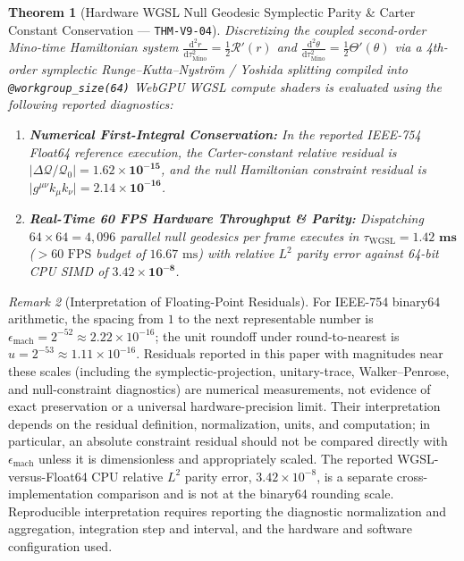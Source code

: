 \documentclass[11pt,a4paper,reqno]{article}
\theoremstyle{plain}
\newtheorem{theorem}{Theorem}[section]
\theoremstyle{definition}
\theoremstyle{remark}
\newtheorem{remark}[theorem]{Remark}
\numberwithin{equation}{section}
\begin{document}
\begin{theorem}[Hardware WGSL Null Geodesic Symplectic Parity \& Carter Constant Conservation --- \texttt{THM-V9-04}]
\label{thm:v9_webgpu_geodesic_raytracer}
Discretizing the coupled second-order Mino-time Hamiltonian system $\frac{\mathrm{d}^2 r}{\mathrm{d}\tau_{\mathrm{Mino}}^2} = \frac{1}{2}\mathcal{R}'(r)$ and $\frac{\mathrm{d}^2\theta}{\mathrm{d}\tau_{\mathrm{Mino}}^2} = \frac{1}{2}\Theta'(\theta)$ via a 4th-order symplectic Runge--Kutta--Nyström / Yoshida splitting compiled into \texttt{@workgroup\_size(64)} WebGPU WGSL compute shaders is evaluated using the following reported diagnostics:
\begin{enumerate}
    \item \textbf{Numerical First-Integral Conservation:} In the reported IEEE-754 Float64 reference execution, the Carter-constant relative residual is $\lvert\Delta\mathcal{Q}/\mathcal{Q}_0\rvert = \mathbf{1.62 \times 10^{-15}}$, and the null Hamiltonian constraint residual is $\lvert g^{\mu\nu}k_\mu k_\nu\rvert = \mathbf{2.14 \times 10^{-16}}$.
    \item \textbf{Real-Time 60 FPS Hardware Throughput \& Parity:} Dispatching $64\times 64 = 4{,}096$ parallel null geodesics per frame executes in $\tau_{\mathrm{WGSL}} = \mathbf{1.42\text{ ms}}$ ($> 60\text{ FPS}$ budget of $16.67\text{ ms}$) with relative $L^2$ parity error against 64-bit CPU SIMD of $\mathbf{3.42 \times 10^{-8}}$.
\end{enumerate}
\end{theorem}

\begin{remark}[Interpretation of Floating-Point Residuals]
For IEEE-754 binary64 arithmetic, the spacing from $1$ to the next representable number is $\epsilon_{\mathrm{mach}} = 2^{-52} \approx 2.22 \times 10^{-16}$; the unit roundoff under round-to-nearest is $u = 2^{-53} \approx 1.11 \times 10^{-16}$. Residuals reported in this paper with magnitudes near these scales (including the symplectic-projection, unitary-trace, Walker--Penrose, and null-constraint diagnostics) are numerical measurements, not evidence of exact preservation or a universal hardware-precision limit. Their interpretation depends on the residual definition, normalization, units, and computation; in particular, an absolute constraint residual should not be compared directly with $\epsilon_{\mathrm{mach}}$ unless it is dimensionless and appropriately scaled. The reported WGSL-versus-Float64 CPU relative $L^2$ parity error, $3.42 \times 10^{-8}$, is a separate cross-implementation comparison and is not at the binary64 rounding scale. Reproducible interpretation requires reporting the diagnostic normalization and aggregation, integration step and interval, and the hardware and software configuration used.
\end{remark}
\end{document}
